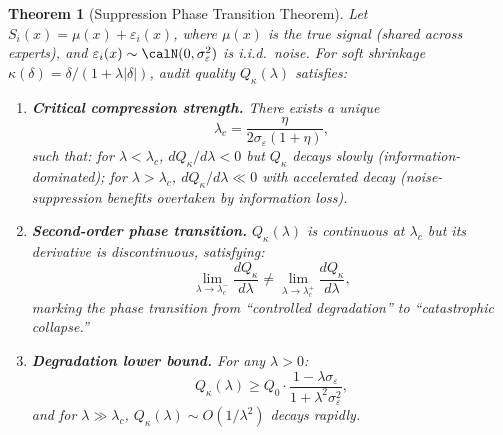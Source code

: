 \documentclass[12pt,a4paper]{article}
\newtheorem{theorem}{Theorem}[section]
\theoremstyle{definition}
\begin{document}
\begin{theorem}[Suppression Phase Transition Theorem]
\label{thm:phase_transition}
Let $S_i(x) = \mu(x) + \varepsilon_i(x)$, where $\mu(x)$ is the true signal (shared across experts), and $\varepsilon_i(x) \sim \calN(0, \sigma_\varepsilon^2)$ is i.i.d.\ noise. For soft shrinkage $\kappa(\delta) = \delta/(1 + \lambda|\delta|)$, audit quality $Q_\kappa(\lambda)$ satisfies:

\begin{enumerate}[label=(\roman*)]
    \item \textbf{Critical compression strength.} There exists a unique
    \begin{equation}
        \lambda_c = \frac{\eta}{2\sigma_\varepsilon(1+\eta)},
    \end{equation}
    such that: for $\lambda < \lambda_c$, $dQ_\kappa/d\lambda < 0$ but $Q_\kappa$ decays slowly (information-dominated); for $\lambda > \lambda_c$, $dQ_\kappa/d\lambda \ll 0$ with accelerated decay (noise-suppression benefits overtaken by information loss).

    \item \textbf{Second-order phase transition.} $Q_\kappa(\lambda)$ is continuous at $\lambda_c$ but its derivative is discontinuous, satisfying:
    \begin{equation}
        \lim_{\lambda \to \lambda_c^-} \frac{dQ_\kappa}{d\lambda} \neq \lim_{\lambda \to \lambda_c^+} \frac{dQ_\kappa}{d\lambda},
    \end{equation}
    marking the phase transition from ``controlled degradation'' to ``catastrophic collapse.''

    \item \textbf{Degradation lower bound.} For any $\lambda > 0$:
    \begin{equation}
        Q_\kappa(\lambda) \geq Q_0 \cdot \frac{1 - \lambda\sigma_\varepsilon}{1 + \lambda^2\sigma_\varepsilon^2},
    \end{equation}
    and for $\lambda \gg \lambda_c$, $Q_\kappa(\lambda) \sim O(1/\lambda^2)$ decays rapidly.
\end{enumerate}
\end{theorem}
\end{document}
